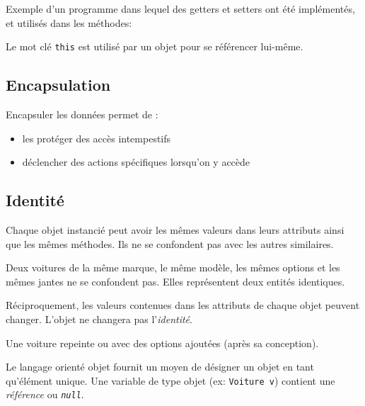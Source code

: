 			\begin{exemple}
				Exemple d'un programme dans lequel des getters et setters ont été implémentés, et utilisés dans les méthodes:
				
			\end{exemple}
		
			\begin{remarque}
				Le mot clé \lstinline|this| est utilisé par un objet pour se référencer lui-même.
			\end{remarque}
		
		\subsection{Encapsulation}
		
			Encapsuler les données permet de :
			\begin{itemize}
				\item les protéger des accès intempestifs
				\item déclencher des actions spécifiques lorsqu'on y accède
			\end{itemize}
		
		\subsection{Identité}
		
			Chaque objet instancié peut avoir les mêmes valeurs dans leurs attributs ainsi que les mêmes méthodes. Ils ne se confondent pas avec les autres similaires.
			
			\begin{exemple}
				Deux voitures de la même marque, le même modèle, les mêmes options et les mêmes jantes ne se confondent pas. Elles représentent deux entités identiques.
			\end{exemple}
		
			Réciproquement, les valeurs contenues dans les attributs de chaque objet peuvent changer. L'objet ne changera pas l'\emph{identité}.
			
			\begin{exemple}
				Une voiture repeinte ou avec des options ajoutées (après sa conception).
			\end{exemple}
		
			Le langage orienté objet fournit un moyen de désigner un objet en tant qu'élément unique.
			Une variable de type objet (ex: \lstinline|Voiture v|) contient une \emph{référence} ou \emph{\lstinline|null|}.
			
